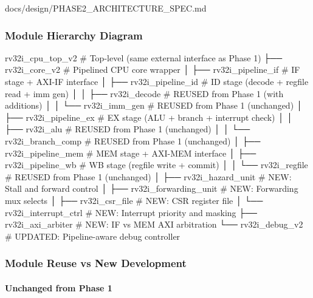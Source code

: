 \begin{relocated}{docs/design/PHASE2_ARCHITECTURE_SPEC.md}
\subsubsection{Module Hierarchy Diagram}\label{ds:ch:phase2-architecture:51-module-hierarchy-diagram}

\begin{textblock}
rv32i_cpu_top_v2                    # Top-level (same external interface as Phase 1)
├── rv32i_core_v2                   # Pipelined CPU core wrapper
│   ├── rv32i_pipeline_if           # IF stage + AXI-IF interface
│   ├── rv32i_pipeline_id           # ID stage (decode + regfile read + imm gen)
│   │   ├── rv32i_decode            # REUSED from Phase 1 (with additions)
│   │   └── rv32i_imm_gen           # REUSED from Phase 1 (unchanged)
│   ├── rv32i_pipeline_ex           # EX stage (ALU + branch + interrupt check)
│   │   ├── rv32i_alu               # REUSED from Phase 1 (unchanged)
│   │   └── rv32i_branch_comp       # REUSED from Phase 1 (unchanged)
│   ├── rv32i_pipeline_mem          # MEM stage + AXI-MEM interface
│   ├── rv32i_pipeline_wb           # WB stage (regfile write + commit)
│   │   └── rv32i_regfile           # REUSED from Phase 1 (unchanged)
│   ├── rv32i_hazard_unit           # NEW: Stall and forward control
│   ├── rv32i_forwarding_unit       # NEW: Forwarding mux selects
│   ├── rv32i_csr_file              # NEW: CSR register file
│   └── rv32i_interrupt_ctrl        # NEW: Interrupt priority and masking
├── rv32i_axi_arbiter               # NEW: IF vs MEM AXI arbitration
└── rv32i_debug_v2                  # UPDATED: Pipeline-aware debug controller
\end{textblock}

\subsubsection{Module Reuse vs New Development}\label{ds:ch:phase2-architecture:52-module-reuse-vs-new-development}

\paragraph{Unchanged from Phase 1}\label{ds:ch:phase2-architecture:unchanged-from-phase-1}

{\small\setlength{\tabcolsep}{4pt}

}
\end{relocated}
